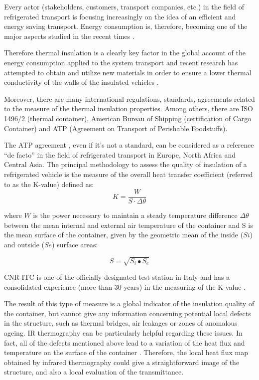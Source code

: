 \documentclass{tQRT2e}
\begin{document}
Every actor (stakeholders, customers, transport companies, etc.) in the field of refrigerated transport is focusing increasingly on the idea of an efficient and energy saving transport. Energy consumption is, therefore, becoming one of the major aspects studied in the recent times \cite{Tassou2009,Cavalier2010,Adekomaya2017}. 

Therefore thermal insulation is a clearly key factor in the global account of the energy consumption applied to the system transport and recent research has attempted to obtain and utilize new materials in order to ensure a lower thermal conductivity of the walls of the insulated vehicles \cite{Tinti2014,Lawton2016}.

Moreover, there are many international regulations, standards, agreements related to the measure of the thermal insulation properties. Among others, there are ISO 1496/2 (thermal container), American Bureau of Shipping (certification of Cargo Container) and ATP (Agreement on Transport of Perishable Foodstuffs).

The ATP agreement \cite{Geneva1970}, even if it’s not a standard, can be considered as a reference “de facto” in the field of refrigerated transport in Europe, North Africa and Central Asia. The principal methodology to assess the quality of insulation of a refrigerated vehicle is the measure of the overall heat transfer coefficient (referred to as the K-value) defined as:
\begin{equation}
K=\frac{W}{S⋅\Delta \theta}
\end{equation}


where $ W $ is the power necessary to maintain a steady temperature difference $ \Delta \theta $ between the mean internal and external air temperature of the container and S is the mean surface of the container, given by the geometric mean of the inside ($ Si $) and outside ($ Se $) surface areas:

\begin{equation}
S=\sqrt{S_i∙S_e}
\end{equation}

CNR-ITC is one of the officially designated test station in Italy and has a consolidated experience (more than 30 years) in the measuring of the K-value \cite{rossi2009k}.

The result of this type of measure is a global indicator of the insulation quality of the container, but cannot give any information concerning potential local defects in the structure, such as thermal bridges, air leakages or zones of anomalous ageing. IR thermography can be particularly helpful regarding these issues. In fact, all of the defects mentioned above lead to a variation of the heat flux and temperature on the surface of the container \cite{grinzato2010r, grinzatoquality, grinzato1comparison}. Therefore, the local heat flux map obtained by infrared thermography could give a straightforward image of the structure, and also a local evaluation of the transmittance.
\end{document}

